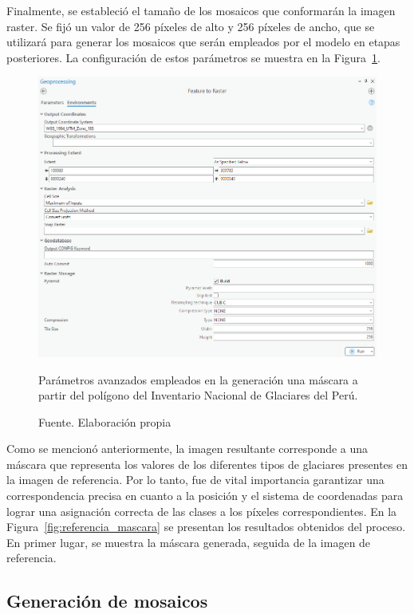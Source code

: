 \documentclass[12pt]{report}
\begin{document}
Finalmente, se estableció el tamaño de los mosaicos que conformarán la imagen raster. Se fijó un valor de 256 píxeles de alto y 256 píxeles de ancho, que se utilizará para generar los mosaicos que serán empleados por el modelo en etapas posteriores. La configuración de estos parámetros se muestra en la Figura~\ref{fig:generacion_mascara_02}.

\begin{figure}[H]
   \centering 
   \includegraphics[width=1\textwidth]{Images/generacion_mascara_02.png}
   \caption{Parámetros avanzados empleados en la generación una máscara a partir del polígono del Inventario Nacional de Glaciares del Perú.}
   \caption*{Fuente. Elaboración propia}
   \label{fig:generacion_mascara_02}
\end{figure}

Como se mencionó anteriormente, la imagen resultante corresponde a una máscara que representa los valores de los diferentes tipos de glaciares presentes en la imagen de referencia. Por lo tanto, fue de vital importancia garantizar una correspondencia precisa en cuanto a la posición y el sistema de coordenadas para lograr una asignación correcta de las clases a los píxeles correspondientes. En la Figura~\ref{fig:referencia_mascara} se presentan los resultados obtenidos del proceso. En primer lugar, se muestra la máscara generada, seguida de la imagen de referencia.

\subsection{Generación de mosaicos}
\end{document}
